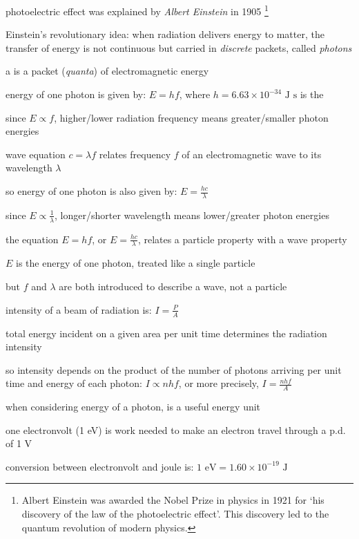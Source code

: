 photoelectric effect was explained by \emph{Albert Einstein} in 1905
\footnote{Albert Einstein was awarded the Nobel Prize in physics in 1921 for `his discovery of the law of the photoelectric effect'. This discovery led to the quantum revolution of modern physics.}

Einstein's revolutionary idea: when radiation delivers energy to matter, the transfer of energy is not continuous but carried in \emph{discrete} packets, called \emph{photons}

\begin{ilight}
	a  is a packet (\emph{quanta}) of electromagnetic energy
\end{ilight}

\cmt energy of one photon is given by: $\boxed{E=hf}$, where $h=6.63\times10^{-34} \text{ J s}$ is the 

since $E \propto f$, higher/lower radiation frequency means greater/smaller photon energies

\cmt wave equation $c=\lambda f$ relates frequency $f$ of an electromagnetic wave to its wavelength $\lambda$

so energy of one photon is also given by: $\boxed{E=\frac{hc}{\lambda}}$

since $E \propto \frac{1}{\lambda}$, longer/shorter wavelength means lower/greater photon energies

\cmt the equation $E=hf$, or $E=\frac{hc}{\lambda}$,  relates a particle property with a wave property

$E$ is the energy of one photon, treated like a single particle

but $f$ and $\lambda$ are both introduced to describe a wave, not a particle

\cmt intensity of a beam of radiation is: $I = \frac{P}{A}$

total energy incident on a given area per unit time determines the radiation intensity

so intensity depends on the product of the number of photons arriving per unit time and energy of each photon: $ \boxed{I \propto nhf}$, or more precisely, $I = \frac{nhf}{A}$

\cmt when considering energy of a photon,  is a useful energy unit

one electronvolt (1 eV) is work needed to make an electron travel through a p.d. of 1 V

conversion between electronvolt and joule is: $\boxed{1 \text{ eV} = 1.60\times10^{-19} \text{ J}}$


